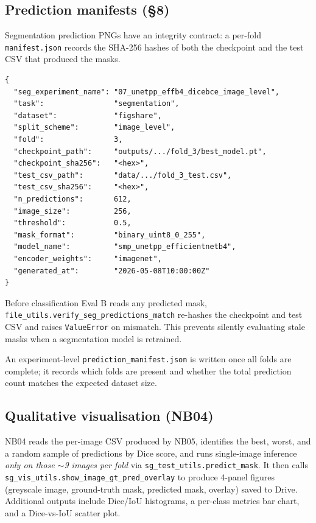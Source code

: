 \documentclass[12pt,a4paper]{article}
\begin{document}
\subsection{Prediction manifests (§8)}
\label{sec:manifests}

Segmentation prediction PNGs have an integrity contract: a per-fold
\texttt{manifest.json} records the SHA-256 hashes of both the checkpoint and
the test CSV that produced the masks.

\begin{lstlisting}[language={}, caption={Per-fold manifest schema.}]
{
  "seg_experiment_name": "07_unetpp_effb4_dicebce_image_level",
  "task":                "segmentation",
  "dataset":             "figshare",
  "split_scheme":        "image_level",
  "fold":                3,
  "checkpoint_path":     "outputs/.../fold_3/best_model.pt",
  "checkpoint_sha256":   "<hex>",
  "test_csv_path":       "data/.../fold_3_test.csv",
  "test_csv_sha256":     "<hex>",
  "n_predictions":       612,
  "image_size":          256,
  "threshold":           0.5,
  "mask_format":         "binary_uint8_0_255",
  "model_name":          "smp_unetpp_efficientnetb4",
  "encoder_weights":     "imagenet",
  "generated_at":        "2026-05-08T10:00:00Z"
}
\end{lstlisting}

Before classification Eval B reads any predicted mask,
\texttt{file\_utils.verify\_seg\_predictions\_match} re-hashes the checkpoint
and test CSV and raises \texttt{ValueError} on mismatch.  This prevents silently
evaluating stale masks when a segmentation model is retrained.

An experiment-level \texttt{prediction\_manifest.json} is written once all
folds are complete; it records which folds are present and whether the total
prediction count matches the expected dataset size.

\subsection{Qualitative visualisation (NB04)}

NB04 reads the per-image CSV produced by NB05, identifies the best, worst, and
a random sample of predictions by Dice score, and runs single-image inference
\emph{only on those $\sim$9 images per fold} via
\texttt{sg\_test\_utils.predict\_mask}.  It then calls
\texttt{sg\_vis\_utils.show\_image\_gt\_pred\_overlay} to produce 4-panel
figures (greyscale image, ground-truth mask, predicted mask, overlay) saved to
Drive.  Additional outputs include Dice/IoU histograms, a per-class metrics bar
chart, and a Dice-vs-IoU scatter plot.
\end{document}
